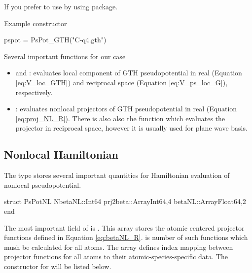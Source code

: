 If you prefer to use  by using 
package.

Example constructor
\begin{juliacode}
pspot = PsPot_GTH("C-q4.gth")
\end{juliacode}

Several important functions for our case
\begin{itemize}
\item {} and : evaluates local component
  of GTH pseudopotential in real (Equation \eqref{eq:V_loc_GTH})
  and reciprocal space (Equation \eqref{eq:V_ps_loc_G}), respectively.
\item {}: evaluates nonlocal projectors
  of GTH pseudopotential in real (Equation \eqref{eq:proj_NL_R}).
  There is also also the function  which evaluates the
  projector in reciprocal space, however it is usually used for plane wave basis.
\end{itemize}


\subsection{Nonlocal Hamiltonian}

The type  stores several important quantities for Hamiltonian
evaluation of nonlocal pseudopotential.
%
\begin{juliacode}
struct PsPotNL
    NbetaNL::Int64
    prj2beta::Array{Int64,4}
    betaNL::Array{Float64,2}
end
\end{juliacode}
%
The most important field of  is . This array stores
the atomic centered projector functions defined in Equation \eqref{eq:betaNL_R}.
 is number of such functions which mush be calculated for
all atoms. The array  defines index mapping between projector
functions for all atoms to their atomic-species-specific data. The constructor
for  will be listed below.

